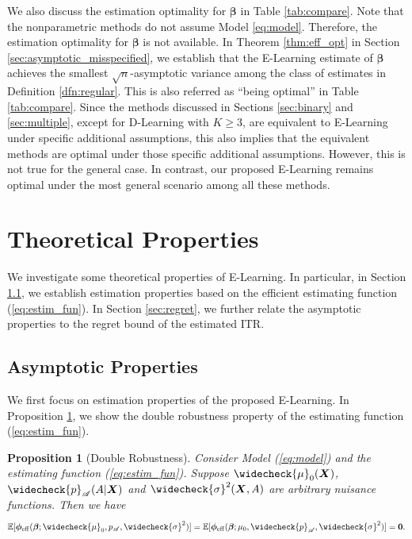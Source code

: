 \documentclass[11pt]{article}
\newtheorem{prop}[thm]{Proposition}
\theoremstyle{definition}
\theoremstyle{remark}
\newcommand{\bX}{\bm{X}}
\newcommand{\bbeta}{\bm{\beta}}
\newcommand{\bphi}{\bm{\phi}}
\newcommand{\bbE}{\mathbb{E}}
\newcommand{\sA}{\mathscr{A}}
\newcommand{\bzero}{\mathbf{0}}	%
\newcommand{\eff}{\mathrm{eff}}
\begin{document}
We also discuss the estimation optimality for $ \bbeta $ in Table \ref{tab:compare}. Note that the nonparametric methods do not assume Model \eqref{eq:model}. Therefore, the estimation optimality for $ \bbeta $ is not available. In Theorem \ref{thm:eff_opt} in Section \ref{sec:asymptotic_misspecified}, we establish that the E-Learning estimate of $ \bbeta $ achieves the smallest $ \sqrt{n} $-asymptotic variance among the class of estimates in Definition \ref{dfn:regular}. This is also referred as ``being optimal'' in Table \ref{tab:compare}. Since the methods discussed in Sections \ref{sec:binary} and \ref{sec:multiple}, except for D-Learning with $ K \ge 3 $, are equivalent to E-Learning under specific additional assumptions, this also implies that the equivalent methods are optimal under those specific additional assumptions. However, this is not true for the general case. In contrast, our proposed E-Learning remains optimal under the most general scenario among all these methods. 

\section{Theoretical Properties}\label{sec:theory}
We investigate some theoretical properties of E-Learning. In particular, in Section \ref{sec:asymptotic}, we establish estimation properties based on the efficient estimating function (\ref{eq:estim_fun}). In Section \ref{sec:regret}, we further relate the asymptotic properties to the regret bound of the estimated ITR.

\subsection{Asymptotic Properties}\label{sec:asymptotic}
We first focus on estimation properties of the proposed E-Learning. In Proposition \ref{prop:dr}, we show the double robustness property of the estimating function (\ref{eq:estim_fun}). 

\begin{prop}[Double Robustness]\label{prop:dr}
	Consider Model (\ref{eq:model}) and the estimating function (\ref{eq:estim_fun}). Suppose $ \widecheck{\mu}_{0}(\bX) $, $ \widecheck{p}_{\sA}(A|\bX) $ and $ \widecheck{\sigma}^{2}(\bX,A) $ are arbitrary nuisance functions. Then we have
	\[ \bbE[ \bphi_{\eff}(\bbeta;\widecheck{\mu}_{0},p_{\sA},\widecheck{\sigma}^{2})] = \bbE[\bphi_{\eff}(\bbeta;\mu_{0},\widecheck{p}_{\sA},\widecheck{\sigma}^{2})] = \bzero. \]
\end{prop}
\end{document}
